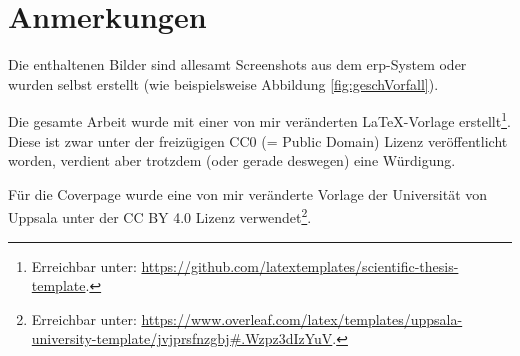 \chapter{Anmerkungen}
Die enthaltenen Bilder sind allesamt Screenshots aus dem \gls{erp}-System oder wurden selbst erstellt (wie beispielsweise Abbildung \ref{fig:geschVorfall}).

Die gesamte Arbeit wurde mit einer von mir veränderten \LaTeX-Vorlage erstellt\footnote{Erreichbar unter: \url{https://github.com/latextemplates/scientific-thesis-template}.}. Diese ist zwar unter der freizügigen CC0 (= Public Domain) Lizenz veröffentlicht worden, verdient aber trotzdem (oder gerade deswegen) eine Würdigung.

Für die Coverpage wurde eine von mir veränderte Vorlage der Universität von Uppsala unter der CC BY 4.0 Lizenz verwendet\footnote{Erreichbar unter: \url{https://www.overleaf.com/latex/templates/uppsala-university-template/jvjprsfnzgbj#.Wzpz3dIzYuV}.}.